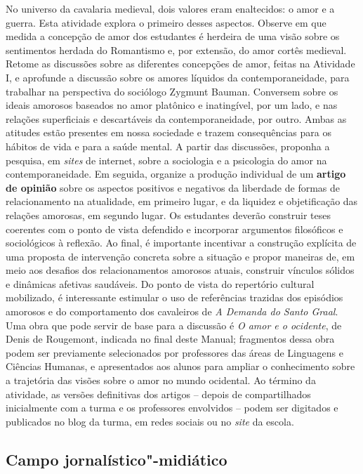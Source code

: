 \documentclass[11pt]{extarticle}
\begin{document}
  No universo da cavalaria medieval, dois valores eram enaltecidos: o
  amor e a guerra. Esta atividade explora o primeiro desses aspectos.
  Observe em que medida a concepção de amor dos estudantes é herdeira de
  uma visão sobre os sentimentos herdada do Romantismo e, por extensão,
  do amor cortês medieval. Retome as discussões sobre as diferentes
  concepções de amor, feitas na Atividade I, e aprofunde a discussão
  sobre os amores líquidos da contemporaneidade, para trabalhar na
  perspectiva do sociólogo Zygmunt Bauman. Conversem sobre os ideais
  amorosos baseados no amor platônico e inatingível, por um lado, e nas
  relações superficiais e descartáveis da contemporaneidade, por outro.
  Ambas as atitudes estão presentes em nossa sociedade e trazem
  consequências para os hábitos de vida e para a saúde mental. A partir
  das discussões, proponha a pesquisa, em \emph{sites} de internet,
  sobre a sociologia e a psicologia do amor na contemporaneidade. Em
  seguida, organize a produção individual de um \textbf{artigo de
  opinião} sobre os aspectos positivos e negativos da liberdade de
  formas de relacionamento na atualidade, em primeiro lugar, e da
  liquidez e objetificação das relações amorosas, em segundo lugar. Os
  estudantes deverão construir teses coerentes com o ponto de vista
  defendido e incorporar argumentos filosóficos e sociológicos à
  reflexão. Ao final, é importante incentivar a construção explícita de
  uma proposta de intervenção concreta sobre a situação e propor
  maneiras de, em meio aos desafios dos relacionamentos amorosos atuais,
  construir vínculos sólidos e dinâmicas afetivas saudáveis. Do ponto de
  vista do repertório cultural mobilizado, é interessante estimular o
  uso de referências trazidas dos episódios amorosos e do comportamento
  dos cavaleiros de \emph{A Demanda do Santo Graal}. Uma obra que pode
  servir de base para a discussão é \emph{O amor e o ocidente}, de Denis
  de Rougemont, indicada no final deste Manual; fragmentos dessa obra
  podem ser previamente selecionados por professores das áreas de
  Linguagens e Ciências Humanas, e apresentados aos alunos para ampliar
  o conhecimento sobre a trajetória das visões sobre o amor no mundo
  ocidental. Ao término da atividade, as versões definitivas dos artigos
  -- depois de compartilhados inicialmente com a turma e os professores
  envolvidos -- podem ser digitados e publicados no blog da turma, em
  redes sociais ou no \emph{site} da escola.

\subsection{Campo jornalístico"-midiático }
\end{document}
